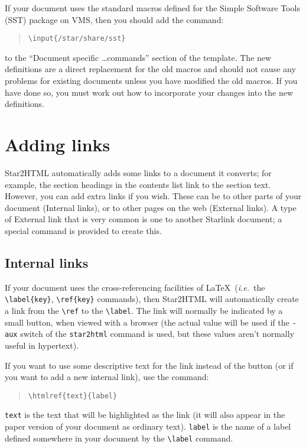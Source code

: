 \documentclass[twoside,11pt]{article}
\newcommand{\htmlref}[2]{#1}
\newcommand{\xlabel}[1]{}
\renewcommand{\_}{\texttt{\symbol{95}}}
\begin{document}
If your document uses the standard macros defined for the Simple
Software Tools (SST) package on VMS, then you should add the command:
\begin{quote}
\verb+\+\verb+input{/star/share/sst}+
\end{quote}
to the ``Document specific \ldots commands'' section of the template.
The new definitions are a direct replacement for the old macros and should not
cause any problems for existing documents unless you have modified the old
macros.
If you have done so, you must work out how to incorporate your changes into
the new definitions.

\section{\xlabel{adding_links}Adding links}

Star2HTML automatically adds some links to a document it converts; for example,
the section headings in the contents list link to the section text.
However, you can add extra links if you wish.
These can be to other parts of your document (Internal links), or to
other pages on the web (External links).
A type of External link that is very common is one to another Starlink
document; a special command is provided to create this.

\subsection{\xlabel{internal_links}Internal links}

If your document uses the cross-referencing facilities of \LaTeX\
({\em{i.e.}}\ the \verb+\label{key}+, \verb+\ref{key}+ commands), then
Star2HTML will automatically create a link from the \verb+\ref+ to the
\verb+\label+.
The link will normally be indicated by a small button, when viewed with a
browser (the actual value will be used if the \texttt{-aux} switch of the
\texttt{star2html} command is used, but these values aren't normally useful
in hypertext).

If you want to use some descriptive text for the link instead of the button
(or if you want to add a new internal link), use the command:

\begin{quote}
\begin{verbatim}
\htmlref{text}{label}
\end{verbatim}
\end{quote}

\texttt{text} is the text that will be highlighted as the link (it will also
appear in the paper version of your document as ordinary text).
\texttt{label} is the name of a label defined somewhere in your document by
the \verb#\label# command.
\end{document}
